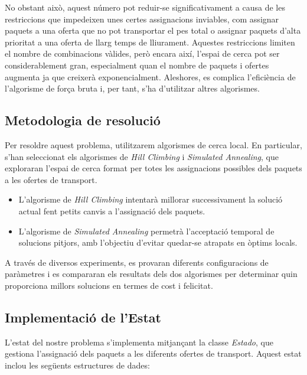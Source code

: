 \documentclass[a4paper]{article}
\begin{document}
	No obstant això, aquest número pot reduir-se significativament a causa de les restriccions que impedeixen unes certes assignacions inviables, com assignar paquets a una oferta que no pot transportar el pes total o assignar paquets d'alta prioritat a una oferta de llarg temps de lliurament. Aquestes restriccions limiten el nombre de combinacions vàlides, però encara així, l'espai de cerca pot ser considerablement gran, especialment quan el nombre de paquets i ofertes augmenta ja que creixerà  exponencialment. Aleshores, es complica l'eficiència de l'algorisme de força bruta i, per tant, s'ha d'utilitzar altres algorismes. \\

	\subsection{Metodologia de resolució}
	
	Per resoldre aquest problema, utilitzarem algorismes de cerca local. En particular, s'han seleccionat els algorismes de \emph{Hill Climbing} i \emph{Simulated Annealing}, que exploraran l'espai de cerca format per totes les assignacions possibles dels paquets a les ofertes de transport.
	
	\begin{itemize}
		\item L'algorisme de \emph{Hill Climbing} intentarà millorar successivament la solució actual fent petits canvis a l'assignació dels paquets.
		\item L'algorisme de \emph{Simulated Annealing} permetrà l'acceptació temporal de solucions pitjors, amb l'objectiu d'evitar quedar-se atrapats en òptims locals.
	\end{itemize}
	
	A través de diversos experiments, es provaran diferents configuracions de paràmetres i es compararan els resultats dels dos algorismes per determinar quin proporciona millors solucions en termes de cost i felicitat.
	
	\subsection{Implementació de l'Estat}
	
	L'estat del nostre problema s'implementa mitjançant la classe \emph{Estado}, que gestiona l'assignació dels paquets a les diferents ofertes de transport. Aquest estat inclou les següents estructures de dades:
	
\end{document}
